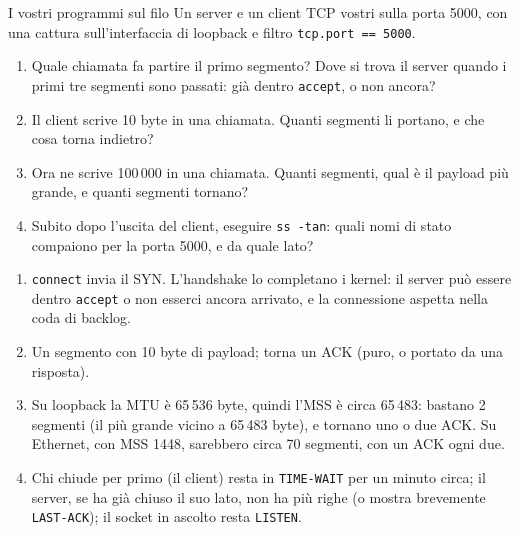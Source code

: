\begin{esercizio}{I vostri programmi sul filo}
Un server e un client TCP vostri sulla porta 5000, con una cattura sull'interfaccia di loopback e filtro \texttt{tcp.port == 5000}.
\begin{enumerate}[label=(\alph*)]
    \item Quale chiamata fa partire il primo segmento? Dove si trova il server quando i primi tre segmenti sono passati: già dentro
          \texttt{accept}, o non ancora?
    \item Il client scrive 10 byte in una chiamata. Quanti segmenti li portano, e che cosa torna indietro?
    \item Ora ne scrive 100\,000 in una chiamata. Quanti segmenti, qual è il payload più grande, e quanti segmenti tornano?
    \item Subito dopo l'uscita del client, eseguire \texttt{ss -tan}: quali nomi di stato compaiono per la porta 5000, e da quale lato?
\end{enumerate}

\svolgimento
\begin{enumerate}[label=(\alph*)]
    \item \texttt{connect} invia il SYN. L'handshake lo completano i kernel: il server può essere dentro \texttt{accept} o non esserci
          ancora arrivato, e la connessione aspetta nella coda di backlog.
    \item Un segmento con 10 byte di payload; torna un ACK (puro, o portato da una risposta).
    \item Su loopback la MTU è 65\,536 byte, quindi l'MSS è circa 65\,483: bastano 2 segmenti (il più grande vicino a 65\,483 byte), e
          tornano uno o due ACK. Su Ethernet, con MSS 1448, sarebbero circa 70 segmenti, con un ACK ogni due.
    \item Chi chiude per primo (il client) resta in \texttt{TIME-WAIT} per un minuto circa; il server, se ha già chiuso il suo lato, non ha
          più righe (o mostra brevemente \texttt{LAST-ACK}); il socket in ascolto resta \texttt{LISTEN}.
\end{enumerate}
\end{esercizio}

